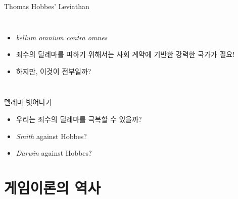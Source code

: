 \documentclass[final]{beamer}
\begin{document}
\begin{frame}[t]{Thomas Hobbes' Leviathan}
	\begin{columns}[c]
		\column{12em}
		\column{20em}
		\begin{itemize}
			\item {\itshape bellum omnium contra omnes}
			\item 죄수의 딜레마를 피하기 위해서는 사회 계약에 기반한 강력한 국가가 필요!
			\item 하지만, 이것이 전부일까? 
		\end{itemize}
	\end{columns}
\end{frame}

\begin{frame}[t]{델레마 벗어나기}
	\begin{itemize}
		\item 우리는 죄수의 딜레마를 극복할 수 있을까? 
		\item {\itshape Smith} against Hobbes?
		\item {\itshape Darwin} against Hobbes?
	\end{itemize}
\end{frame}


\section{게임이론의 역사} %
\label{sec:history}
\end{document}
